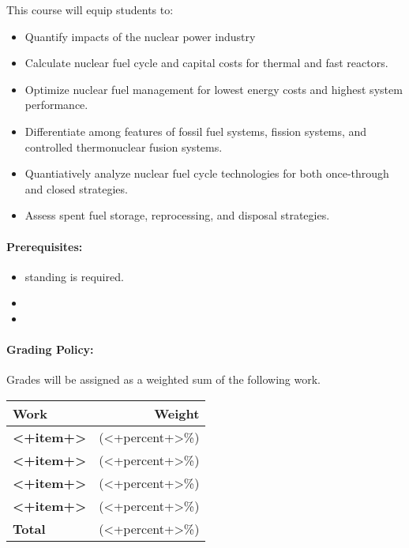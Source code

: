 \documentclass[11pt, a4paper]{article}
\begin{document}
This course will equip students to:

\begin{itemize}
\item Quantify impacts of the nuclear power industry
\item Calculate nuclear fuel cycle and capital costs for thermal and fast reactors.
\item Optimize nuclear fuel management for lowest energy costs and highest system performance.
\item Differentiate among features of fossil fuel systems, fission systems, and controlled thermonuclear fusion systems.
\item Quantiatively analyze nuclear fuel cycle technologies for both once-through and closed strategies.
\item Assess spent fuel storage, reprocessing, and disposal strategies.
\end{itemize}

\paragraph{Prerequisites:} 
\begin{itemize}
\item <+standing+> standing is required.
\item <+required courses+>
\item <+other+>
\end{itemize}

\paragraph{Grading Policy:} Grades will be assigned as a weighted sum of the following work. 

\begin{table}[h]
\begin{tabularx}{\textwidth}{Xr}
\textbf{Work} & \textbf{Weight}\\
\hline
\textbf{<+item+>} & (<+percent+>\%) \\
\textbf{<+item+>} & (<+percent+>\%) \\
\textbf{<+item+>} & (<+percent+>\%) \\
\textbf{<+item+>} & (<+percent+>\%) \\
\hline
\textbf{Total} & (<+percent+>\%) \\
\end{tabularx}
\end{table}
\end{document}
